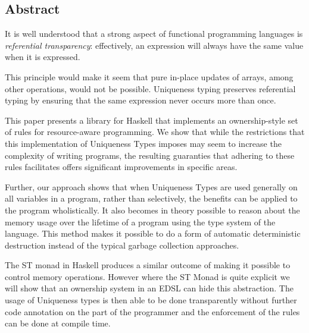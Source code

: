 \documentclass[10pt]{article}
\begin{document}
\begin{multicols}{2}

    \section*{Abstract}

    It is well understood that a strong aspect of functional programming
    languages is \textit{referential transparency}: effectively, an expression
    will always have the same value when it is expressed. %

    This principle would make it seem that pure in-place updates of arrays, among 
    other operations, would not be possible. 
    Uniqueness typing preserves referential typing by ensuring that the same
    expression never occurs more than once.

    This paper presents a library for Haskell that implements an
    ownership-style set of rules for resource-aware programming.
    We show that while the restrictions that this implementation of
    Uniqueness Types imposes may seem to increase the complexity of
    writing programs, the resulting guaranties that
    adhering to these rules facilitates offers significant improvements in 
    specific areas. 

    Further, our approach shows that when Uniqueness Types are used generally
    on all variables in a program, rather than selectively, the benefits can be
    applied to the program wholistically.
    It also becomes in theory possible to reason about the memory usage over the
    lifetime of a program using the type system of the language. 
    This method makes it possible to do a form of automatic deterministic destruction
    instead of the typical garbage collection approaches.

    The ST monad in Haskell produces a similar outcome of making it possible to
    control memory operations.  However where the ST Monad is quite explicit
    we will show that an ownership system in an EDSL can hide this abstraction.
    The usage of Uniqueness types is then able to be done transparently without
    further code annotation on the part of the programmer and the enforcement of
    the rules can be done at compile time.


\end{multicols}
\end{document}
